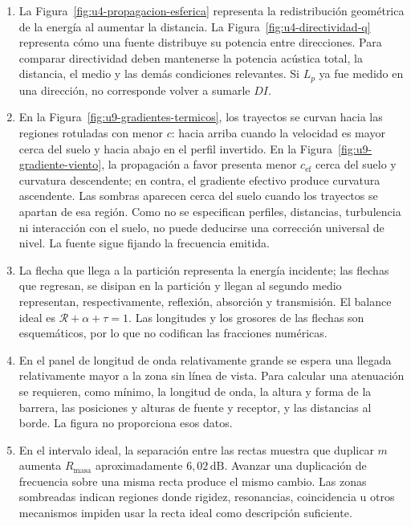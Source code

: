\begin{enumerate}[label=\textbf{V\arabic*.},leftmargin=*]
    \item La Figura~\ref{fig:u4-propagacion-esferica} representa la
    redistribución geométrica de la energía al aumentar la distancia. La
    Figura~\ref{fig:u4-directividad-q} representa cómo una fuente distribuye
    su potencia entre direcciones. Para comparar directividad deben mantenerse
    la potencia acústica total, la distancia, el medio y las demás condiciones
    relevantes. Si \(L_p\) ya fue medido en una dirección, no corresponde
    volver a sumarle \(DI\).

    \item En la Figura~\ref{fig:u9-gradientes-termicos}, los trayectos se
    curvan hacia las regiones rotuladas con menor \(c\): hacia arriba cuando
    la velocidad es mayor cerca del suelo y hacia abajo en el perfil
    invertido. En la Figura~\ref{fig:u9-gradiente-viento}, la propagación a
    favor presenta menor \(c_\mathrm{ef}\) cerca del suelo y curvatura
    descendente; en contra, el gradiente efectivo produce curvatura
    ascendente. Las sombras aparecen cerca del suelo cuando los trayectos se
    apartan de esa región. Como no se especifican perfiles, distancias,
    turbulencia ni interacción con el suelo, no puede deducirse una corrección
    universal de nivel. La fuente sigue fijando la frecuencia emitida.

    \item La flecha que llega a la partición representa la energía incidente;
    las flechas que regresan, se disipan en la partición y llegan al segundo
    medio representan, respectivamente, reflexión, absorción y transmisión.
    El balance ideal es
    \(\mathcal{R}+\alpha+\tau=1\). Las longitudes y los grosores de las flechas
    son esquemáticos, por lo que no codifican las fracciones numéricas.

    \item En el panel de longitud de onda relativamente grande se espera una
    llegada relativamente mayor a la zona sin línea de vista. Para calcular
    una atenuación se requieren, como mínimo, la longitud de onda, la altura y
    forma de la barrera, las posiciones y alturas de fuente y receptor, y las
    distancias al borde. La figura no proporciona esos datos.

    \item En el intervalo ideal, la separación entre las rectas muestra que
    duplicar \(m\) aumenta \(R_\mathrm{masa}\) aproximadamente
    \(6{,}02\,\text{dB}\). Avanzar una duplicación de frecuencia sobre una
    misma recta produce el mismo cambio. Las zonas sombreadas indican regiones
    donde rigidez, resonancias, coincidencia u otros mecanismos impiden usar
    la recta ideal como descripción suficiente.


\end{enumerate}
